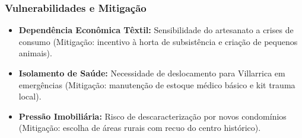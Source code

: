 \subsubsection{Vulnerabilidades e
Mitigação}

\begin{itemize}
\tightlist
\item
  \textbf{Dependência Econômica Têxtil:} Sensibilidade do artesanato a
  crises de consumo (Mitigação: incentivo à horta de subsistência e
  criação de pequenos animais).
\item
  \textbf{Isolamento de Saúde:} Necessidade de deslocamento para
  Villarrica em emergências (Mitigação: manutenção de estoque médico
  básico e kit trauma local).
\item
  \textbf{Pressão Imobiliária:} Risco de descaracterização por novos
  condomínios (Mitigação: escolha de áreas rurais com recuo do centro
  histórico).
\end{itemize}

